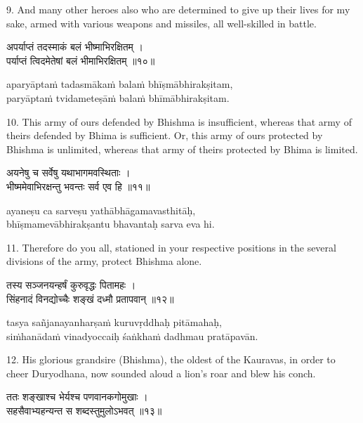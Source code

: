9. And many other heroes also who are determined to give up their lives for my
sake, armed with various weapons and missiles, all well-skilled in battle.

\begin{gitaverse}
अपर्याप्तं तदस्माकं बलं भीष्माभिरक्षितम् । \\
पर्याप्तं त्विदमेतेषां बलं भीमाभिरक्षितम् ॥१०॥
\end{gitaverse}

\begin{transliteration}
aparyāptaṁ tadasmākaṁ balaṁ bhīṣmābhirakṣitam, \\
paryāptaṁ tvidameteṣāṁ balaṁ bhīmābhirakṣitam.
\end{transliteration}

10. This army of ours defended by Bhishma is insufficient, whereas that army of
theirs defended by Bhima is sufficient. Or, this army of ours protected by
Bhishma is unlimited, whereas that army of theirs protected by Bhima is
limited.

\begin{gitaverse}
अयनेषु च सर्वेषु यथाभागमवस्थिताः । \\
भीष्ममेवाभिरक्षन्तु भवन्तः सर्व एव हि ॥११॥
\end{gitaverse}

\begin{transliteration}
ayaneṣu ca sarveṣu yathābhāgamavasthitāḥ, \\
bhīṣmamevābhirakṣantu bhavantaḥ sarva eva hi.
\end{transliteration}

11. Therefore do you all, stationed in your respective positions in the several
divisions of the army, protect Bhishma alone.

\begin{gitaverse}
तस्य सञ्जनयन्हर्षं कुरुवृद्धः पितामहः । \\
सिंहनादं विनद्योच्चैः शङ्खं दध्मौ प्रतापवान् ॥१२॥
\end{gitaverse}

\begin{transliteration}
tasya sañjanayanharṣaṁ kuruvṛddhaḥ pitāmahaḥ, \\
siṁhanādaṁ vinadyoccaiḥ śaṅkhaṁ dadhmau pratāpavān.
\end{transliteration}

12. His glorious grandsire (Bhishma), the oldest of the Kauravas, in order to
cheer Duryodhana, now sounded aloud a lion's roar and blew his conch.

\begin{gitaverse}
ततः शङ्खाश्च भेर्यश्च पणवानकगोमुखाः । \\
सहसैवाभ्यहन्यन्त स शब्दस्तुमुलोऽभवत् ॥१३॥
\end{gitaverse}


